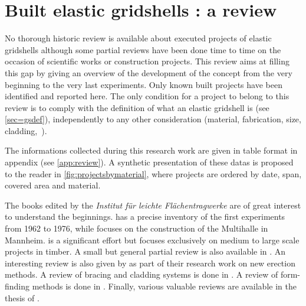 \section{Built elastic gridshells : a review}\label{sec=review_project}


No thorough historic review is available about executed projects of elastic gridshells although some partial reviews have been done time to time on the occasion of scientific works or construction projects. This review aims at filling this gap by giving an overview of the development of the concept from the very beginning to the very last experiments. Only known built projects have been identified and reported here. The only condition for a project to belong to this review is to comply with the definition of what an elastic gridshell is (see \cref{sec=gsdef}), independently to any other consideration (material, fabrication, size, cladding,~\telp{}).

The informations collected during this research work are given in table format in appendix (see \cref{app:review}). A synthetic presentation of these datas is proposed to the reader in \cref{fig:projectsbymaterial}, where projects are ordered by date, span, covered area and material.

The books edited by the \emph{Institut für leichte Flächentragwerke} are of great interest to understand the beginnings.  \cite{IL10} has a precise inventory of the first experiments from 1962 to 1976, while  \cite{IL13} focuses on the construction of the Multihalle in Mannheim.  \cite{Chilton2017} is a significant effort but focuses exclusively on medium to large scale projects in timber. A small but general partial review is also available in \cite{Collins2016}. An interesting review is also given by \citet{Quinn2014} as part of their research work on new erection methods. A review of bracing and cladding systems is done in \cite{Cuvilliers2017}. A review of form-finding methods is done in \cite{Vaulot2016}. Finally, various valuable reviews are available in the thesis of \citet{Douthe2007,Bouhaya2010,Tayeb2015a,Lafuente2015}.


